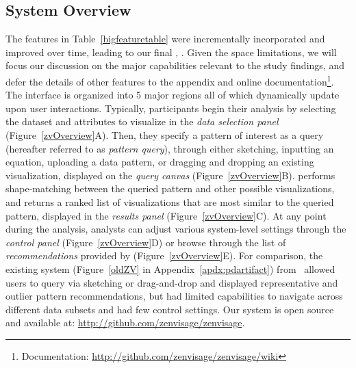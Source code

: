  \subsection{System Overview\label{sec:system}}%
 The features in Table~\ref{bigfeaturetable} were incrementally incorporated and improved over time, leading to our final , \zvpp. Given the space limitations, we will focus our discussion on the major capabilities relevant to the study findings, and defer the details of other features to the appendix and online documentation\footnote{Documentation: \url{http://github.com/zenvisage/zenvisage/wiki}}. The \zvpp interface is organized into 5 major regions all of which dynamically update upon user interactions. Typically, participants begin their analysis by selecting the dataset and attributes to visualize in the \emph{data selection panel} (Figure~\ref{zvOverview}A). Then, they specify a pattern of interest as a query (hereafter referred to as \emph{pattern query}), through either sketching, inputting an equation, uploading a data pattern, or dragging and dropping an existing visualization, displayed on the \emph{query canvas} (Figure~\ref{zvOverview}B). \zvpp performs shape-matching between the queried pattern and other possible visualizations, and returns a ranked list of visualizations that are most similar to the queried pattern, displayed in the \emph{results panel} (Figure~\ref{zvOverview}C). At any point during the analysis, analysts can adjust various system-level settings through the \emph{control panel} (Figure~\ref{zvOverview}D) or browse through the list of \emph{recommendations} provided by \zvpp (Figure~\ref{zvOverview}E). For comparison, the existing \zv system (Figure~\ref{oldZV} in Appendix~\ref{apdx:pdartifact}) from~\cite{Siddiqui2017} allowed users to query via sketching or drag-and-drop and displayed representative and outlier pattern recommendations, but had limited capabilities to navigate across different data subsets and had few control settings. Our \zvpp system is open source and available at: \url{http://github.com/zenvisage/zenvisage}. %
 